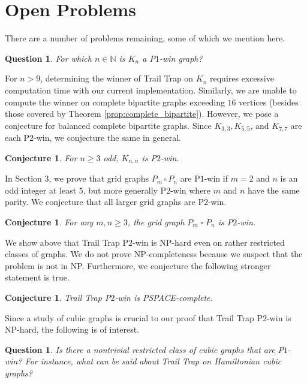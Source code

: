 \documentclass{article}
\theoremstyle{plain}
\newtheorem{conjecture}[theorem]{Conjecture}
\newtheorem{question}[theorem]{Question}
\theoremstyle{definition}
\def\pone{{\rm{P}\ensuremath{1}}}
\def\ptwo{{\rm{P}\ensuremath{2}}}
\begin{document}
\section{Open Problems}
\label{section:conclusion}
There are a number of problems remaining, some of which we mention here. 

\begin{question}
    For which $n\in \mathbb{N}$ is $K_n$ a \pone{}-win graph?
\end{question}
For $n > 9$, determining the winner of {\sc Trail Trap} on $K_n$ requires excessive computation time with our current implementation. Similarly, we are unable to compute the winner on complete bipartite graphs exceeding $16$ vertices (besides those covered by Theorem \ref{prop:complete_bipartite}). However, we pose a conjecture for balanced complete bipartite graphs. Since $K_{3,3}, K_{5,5}$, and $K_{7,7}$ are each \ptwo{}-win, we conjecture the same in general. 

\begin{conjecture}\label{conj:Knn}
   For $n\ge 3$ odd, $K_{n,n}$ is \ptwo{}-win.
\end{conjecture}

In Section 3, we prove that grid graphs $P_m \,\square \, P_n$ are \pone{}-win if $m = 2$ and $n$ is an odd integer at least $5$, but more generally \ptwo{}-win where $m$ and $n$ have the same parity. We conjecture that all larger grid graphs are \ptwo{}-win. 

\begin{conjecture}
    For any $m,n \geq 3$, the grid graph $P_m \mathbin{\square} P_n$ is \ptwo{}-win.
\end{conjecture}


We show above that {\sc Trail Trap \ptwo{}-win} is NP-hard  even on rather restricted classes of graphs. We do not prove NP-completeness because we suspect that the problem is not in NP. Furthermore, we conjecture the following stronger statement is true. 
\begin{conjecture}\label{conj:PSPACE}
    \label{prob:pspace}
    {\sc Trail Trap \ptwo{}-win} is PSPACE-complete.
\end{conjecture}

Since a study of cubic graphs is crucial to our proof that {\sc Trail Trap \ptwo{}-win} is NP-hard, the following is of interest.
\begin{question}\label{ques:hamiltonian}
    Is there a nontrivial restricted class of cubic graphs that are \pone{}-win? For instance, what can be said about {\sc Trail Trap} on Hamiltonian cubic graphs?
\end{question}
\end{document}
